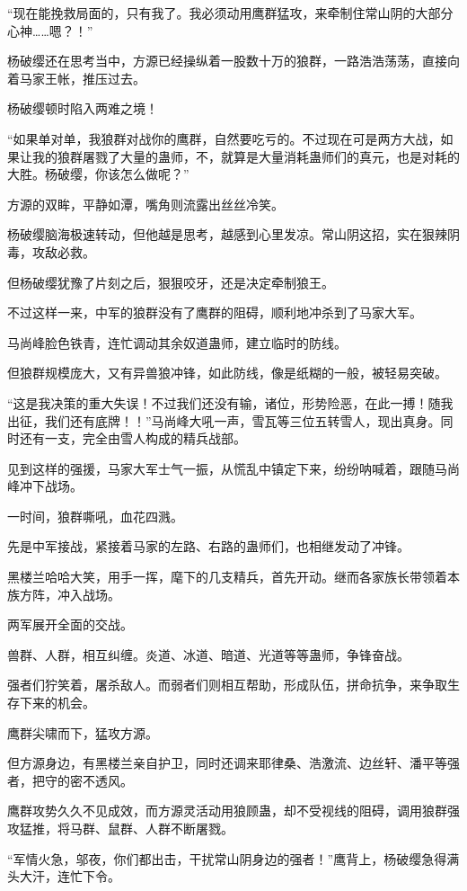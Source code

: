 \begin{this_body}
“现在能挽救局面的，只有我了。我必须动用鹰群猛攻，来牵制住常山阴的大部分心神……嗯？！”

杨破缨还在思考当中，方源已经操纵着一股数十万的狼群，一路浩浩荡荡，直接向着马家王帐，推压过去。

杨破缨顿时陷入两难之境！

“如果单对单，我狼群对战你的鹰群，自然要吃亏的。不过现在可是两方大战，如果让我的狼群屠戮了大量的蛊师，不，就算是大量消耗蛊师们的真元，也是对耗的大胜。杨破缨，你该怎么做呢？”

方源的双眸，平静如潭，嘴角则流露出丝丝冷笑。

杨破缨脑海极速转动，但他越是思考，越感到心里发凉。常山阴这招，实在狠辣阴毒，攻敌必救。

但杨破缨犹豫了片刻之后，狠狠咬牙，还是决定牵制狼王。

不过这样一来，中军的狼群没有了鹰群的阻碍，顺利地冲杀到了马家大军。

马尚峰脸色铁青，连忙调动其余奴道蛊师，建立临时的防线。

但狼群规模庞大，又有异兽狼冲锋，如此防线，像是纸糊的一般，被轻易突破。

“这是我决策的重大失误！不过我们还没有输，诸位，形势险恶，在此一搏！随我出征，我们还有底牌！！”马尚峰大吼一声，雪瓦等三位五转雪人，现出真身。同时还有一支，完全由雪人构成的精兵战部。

见到这样的强援，马家大军士气一振，从慌乱中镇定下来，纷纷呐喊着，跟随马尚峰冲下战场。

一时间，狼群嘶吼，血花四溅。

先是中军接战，紧接着马家的左路、右路的蛊师们，也相继发动了冲锋。

黑楼兰哈哈大笑，用手一挥，麾下的几支精兵，首先开动。继而各家族长带领着本族方阵，冲入战场。

两军展开全面的交战。

兽群、人群，相互纠缠。炎道、冰道、暗道、光道等等蛊师，争锋奋战。

强者们狞笑着，屠杀敌人。而弱者们则相互帮助，形成队伍，拼命抗争，来争取生存下来的机会。

鹰群尖啸而下，猛攻方源。

但方源身边，有黑楼兰亲自护卫，同时还调来耶律桑、浩激流、边丝轩、潘平等强者，把守的密不透风。

鹰群攻势久久不见成效，而方源灵活动用狼顾蛊，却不受视线的阻碍，调用狼群强攻猛推，将马群、鼠群、人群不断屠戮。

“军情火急，邬夜，你们都出击，干扰常山阴身边的强者！”鹰背上，杨破缨急得满头大汗，连忙下令。


\end{this_body}
